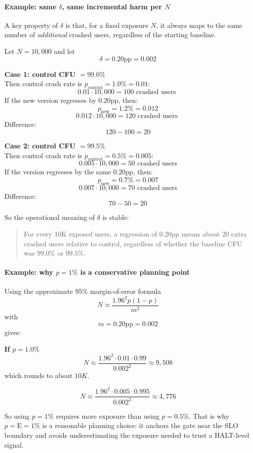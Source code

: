 \documentclass{article}
\newcommand{\E}{\mathrm{E}}
\newcommand{\pp}{\text{pp}}
\begin{document}
\paragraph{Example: same $\delta$, same incremental harm per $N$}
A key property of $\delta$ is that, for a fixed exposure $N$, it always maps to the same number of \emph{additional} crashed users, regardless of the starting baseline.

Let $N = 10{,}000$ and let
\[
\delta = 0.20\pp = 0.002
\]

\textbf{Case 1: control CFU $= 99.0\%$} \\
Then control crash rate is $p_{\text{control}} = 1.0\% = 0.01$:
\[
0.01 \cdot 10{,}000 = 100 \text{ crashed users }
\]
If the new version regresses by $0.20\pp$, then:
\[
p_{\text{new}} = 1.2\% = 0.012
\]
\[
0.012 \cdot 10{,}000 = 120 \text{ crashed users }
\]
Difference:
\[
120 - 100 = 20
\]

\textbf{Case 2: control CFU $= 99.5\%$}\\
Then control crash rate is $p_{\text{control}} = 0.5\% = 0.005$:
\[
0.005 \cdot 10{,}000 = 50 \text{ crashed users}
\]
If the version regresses by the same $0.20\pp$, then:
\[
p_{\text{new}} = 0.7\% = 0.007
\]
\[
0.007 \cdot 10{,}000 = 70 \text{ crashed users}
\]
Difference:
\[
70 - 50 = 20
\]

So the operational meaning of $\delta$ is stable:
\begin{quote}
For every 10K exposed users, a regression of $0.20\pp$ means about 20 extra crashed users relative to control, regardless of whether the baseline CFU was $99.0\%$ or $99.5\%$. 
\end{quote}

\paragraph{Example: why $p = 1\%$ is a conservative planning point}
Using the approximate 95\% margin-of-error formula
\[
N \approx \frac{1.96^2 p(1-p)}{m^2}
\]
with
\[
m = 0.20\pp = 0.002
\]
gives:

\textbf{If $p = 1.0\%$}
\[
N \approx \frac{1.96^2 \cdot 0.01 \cdot 0.99}{0.002^2}
\approx 9{,}508
\]
which rounds to about $10K$.

\[
N \approx \frac{1.96^2 \cdot 0.005 \cdot 0.995}{0.002^2}
\approx 4{,}776
\]

So using $p = 1\%$ requires more exposure than using $p = 0.5\%$.
That is why $p = \E = 1\%$ is a reasonable planning choice: it anchors the gate near the SLO boundary and avoids underestimating the exposure needed to trust a HALT-level signal.
\end{document}

